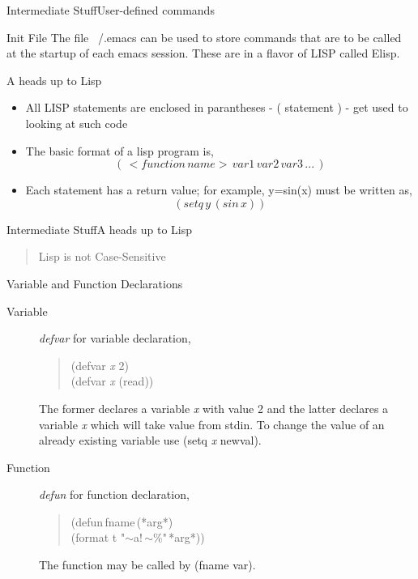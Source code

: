 \documentclass{beamer}
\begin{document}
\begin{frame}{Intermediate Stuff}{User-defined commands}
\begin{block}{Init File}
The file ~/.emacs can be used to store commands that are to be called at the startup of each emacs session. These are in a flavor of LISP called Elisp.
\end{block}
\begin{block}{A heads up to Lisp}
\begin{itemize}
\item All LISP statements are enclosed in parantheses - ( statement ) - get used to looking at such code
\item The basic format of a lisp program is,
$$(\,<function\,name>\,var1\,var2\,var3\,...\,)$$
\item Each statement has a return value; for example, y=sin(x) must be written as,
$$(setq\,y\,(sin\,x))$$
\end{itemize}
\end{block}
\end{frame}

\begin{frame}{Intermediate Stuff}{A heads up to Lisp}
\begin{quote}
Lisp is not Case-Sensitive
\end{quote}
\begin{block}{Variable and Function Declarations}
\begin{description}
\item[Variable] \emph{defvar} for variable declaration,
\begin{quote}
(defvar \emph{x} 2)\\
(defvar \emph{x} (read))
\end{quote}

The former declares a variable \emph{x} with value 2 and the latter declares a variable \emph{x} which will take value from stdin. To change the value of an already existing variable use (setq \emph{x} newval).
\item[Function] \emph{defun} for function declaration,
\begin{quote}
(defun\,fname\,(*arg*)\\(format t "$\sim$a!\,$\sim$\%"\,*arg*))
\end{quote}
The function may be called by (fname var).
\end{description}
\end{block}
\end{frame}
\end{document}
